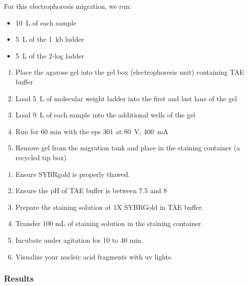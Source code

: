 For this electrophoresis migration, we run:
\begin{itemize}
\item 10~\textmu L of each sample 
\item 5~\textmu L of the 1~kb ladder
\item 5~\textmu L of the 2-log ladder
\end{itemize}

\begin{enumerate}
\item Place the agarose gel into the gel box (electrophoresis unit) containing TAE buffer
\item Load 5~\textmu L of molecular weight ladder into the first and last lane of the gel
\item Load 9~\textmu L of each sample into the additional wells of the gel
\item Run for 60 min with the \gls{eps} 301 at 80~V, 400~mA
\item Remove gel from the migration tank and place in the staining container (a recycled tip box).
\end{enumerate}

\begin{enumerate}
\item Ensure SYBR\cR gold is properly thawed.
\item Ensure the pH of TAE buffer is between 7.5 and 8
\item Prepare the staining solution at 1X SYBR\cR Gold in TAE buffer.
\item Transfer 100 mL of staining solution in the staining container.
\item Incubate under agitation for 10 to 40 min.
\item Visualize your nucleic acid fragments with \gls{uv} lights.
\end{enumerate}

\subsubsection{Results}

